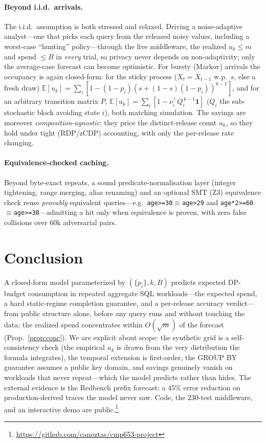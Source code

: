 \documentclass[runningheads]{llncs}
\newcommand{\E}{\mathbb{E}}
\begin{document}
\paragraph{Beyond i.i.d.\ arrivals.} The i.i.d.\ assumption is both stressed and relaxed. Driving a noise-adaptive analyst---one that picks each query from the released noisy values, including a worst-case ``hunting'' policy---through the live middleware, the realized $u_k\le m$ and spend $\le B$ in \emph{every} trial, so privacy never depends on non-adaptivity; only the average-case forecast can become optimistic. For bursty (Markov) arrivals the occupancy is again closed-form: for the sticky process ($X_t{=}X_{t-1}$ w.p.\ $s$, else a fresh draw) $\E[u_k]=\sum_i[1-(1-p_i)(s+(1-s)(1-p_i))^{k-1}]$, and for an arbitrary transition matrix $P$, $\E[u_k]=\sum_i[1-\nu_i^{\!\top}Q_i^{\,k-1}\mathbf 1]$ ($Q_i$ the sub-stochastic block avoiding state $i$), both matching simulation. The savings are moreover \emph{composition-agnostic}: they price the distinct-release count $u_k$, so they hold under tight (RDP/zCDP) accounting, with only the per-release rate changing.

\paragraph{Equivalence-checked caching.} Beyond byte-exact repeats, a sound predicate-normalisation layer (integer tightening, range merging, alias renaming) and an optional SMT (Z3) equivalence check reuse \emph{provably} equivalent queries---e.g.\ \texttt{age>=30}$\equiv$\texttt{age>29} and \texttt{age*2>=60}$\equiv$\texttt{age>=30}---admitting a hit only when equivalence is proven, with zero false collisions over $60$k adversarial pairs.

\section{Conclusion}
\label{sec:concl}

A closed-form model parameterized by $(\{p_i\},k,B)$ predicts expected DP-budget consumption in repeated aggregate SQL workloads---the expected spend, a hard static-regime completion guarantee, and a per-release accuracy verdict---from public structure alone, before any query runs and without touching the data; the realized spend concentrates within $O(\sqrt m)$ of the forecast (Prop.~\ref{prop:conc}). We are explicit about scope: the synthetic grid is a self-consistency check (the empirical $u_k$ is drawn from the very distribution the formula integrates), the temporal extension is first-order, the GROUP BY guarantee assumes a public key domain, and savings genuinely vanish on workloads that never repeat---which the model predicts rather than hides. The external evidence is the Redbench prefix forecast: a $45\%$ error reduction on production-derived traces the model never saw. Code, the $230$-test middleware, and an interactive demo are public.\footnote{\url{https://github.com/canoztas/cmp653-project}}
\end{document}
